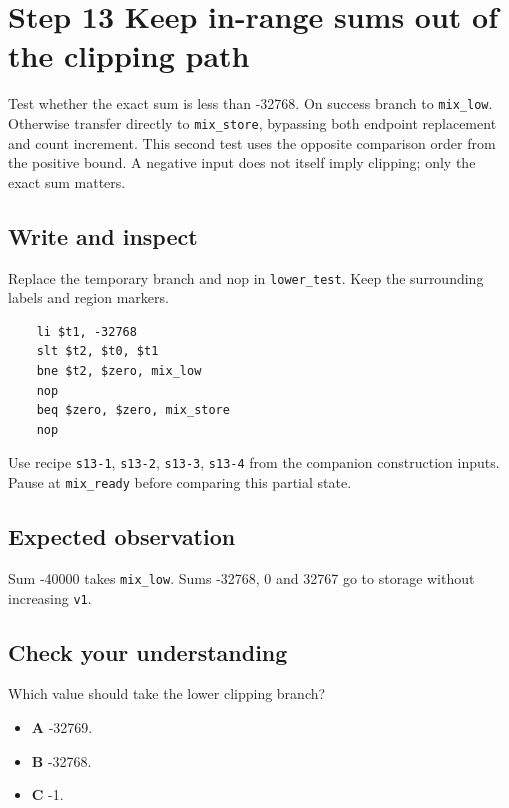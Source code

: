 \section{Step 13 Keep in-range sums out of the clipping path}\label{pcm-s13}

Test whether the exact sum is less than -32768. On success branch to \texttt{mix\_low}. Otherwise transfer directly to \texttt{mix\_store}, bypassing both endpoint replacement and count increment. This second test uses the opposite comparison order from the positive bound. A negative input does not itself imply clipping; only the exact sum matters.

\subsection{Write and inspect}
Replace the temporary branch and nop in \texttt{lower\_test}. Keep the surrounding labels and region markers.

\begin{verbatim}
    li $t1, -32768
    slt $t2, $t0, $t1
    bne $t2, $zero, mix_low
    nop
    beq $zero, $zero, mix_store
    nop
\end{verbatim}
Use recipe \texttt{s13-1}, \texttt{s13-2}, \texttt{s13-3}, \texttt{s13-4} from the companion construction inputs. Pause at \texttt{mix\_ready} before comparing this partial state.

\subsection{Expected observation}
Sum -40000 takes \texttt{mix\_low}. Sums -32768, 0 and 32767 go to storage without increasing \texttt{v1}.

\subsection{Check your understanding}
Which value should take the lower clipping branch?

\begin{itemize}
  \item \textbf{A} -32769.
  \item \textbf{B} -32768.
  \item \textbf{C} -1.
\end{itemize}
